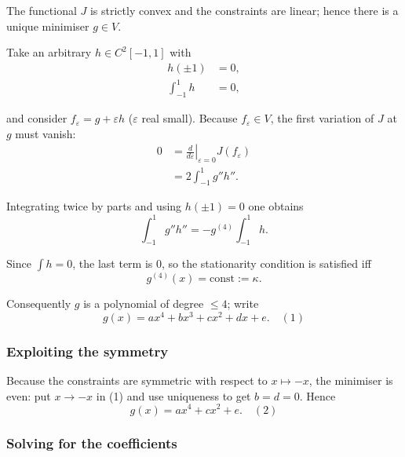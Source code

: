 \documentclass[12pt,a4paper]{article}
\theoremstyle{definition}
\begin{document}
        The functional $J$ is strictly convex and the constraints are linear; hence there is a unique minimiser $g \in V$.

        Take an arbitrary $h \in C^2[-1,1]$ with
        \begin{align}
            h(\pm 1) &= 0, \\
            \int_{-1}^{1} h &= 0,
        \end{align}

        and consider $f_\varepsilon = g + \varepsilon h$ ($\varepsilon$ real small).
        Because $f_\varepsilon \in V$, the first variation of $J$ at $g$ must vanish:
        \begin{align}
            0 &= \left.\frac{d}{d\varepsilon}\right|_{\varepsilon=0} J(f_\varepsilon) \\
            &= 2\int_{-1}^{1} g''h''.
        \end{align}

        Integrating twice by parts and using $h(\pm 1) = 0$ one obtains
        \begin{equation}
            \int_{-1}^{1} g''h'' = -g^{(4)} \int_{-1}^{1} h.
        \end{equation}

        Since $\int h = 0$, the last term is 0, so the stationarity condition is satisfied iff
        \begin{equation}
            g^{(4)}(x) = \text{const} := \kappa.
        \end{equation}

        Consequently $g$ is a polynomial of degree $\leq 4$; write
        \begin{equation}
            g(x) = ax^4 + bx^3 + cx^2 + dx + e. \quad {(1)}
        \end{equation}

        \subsubsection*{Exploiting the symmetry}

        Because the constraints are symmetric with respect to $x \mapsto -x$, the minimiser is even: put $x \to -x$ in (1) and use uniqueness to get $b = d = 0$.
        Hence
        \begin{equation}
            g(x) = ax^4 + cx^2 + e. \quad {(2)}
        \end{equation}

        \subsubsection*{Solving for the coefficients}
\end{document}
